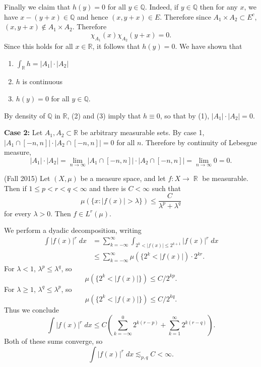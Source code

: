 \documentclass[answers]{exam}
\DeclareMathOperator{\RR}{\mathbb{R}}
\theoremstyle{problemstyle}
\newcommand{\1}[1]{\textbf{1}_{\left[#1\right]}} %
\def\R{\mathbb{R}} %
\def\Q{\mathbb{Q}} %
\begin{document}
\begin{questions}
\begin{solution}
  Finally we claim that $h(y)=0$ for all $y\in \Q$. Indeed, if $y\in \Q$ then for any $x$, we have $x-(y+x)\in \Q$ and hence $(x,y+x)\in E$. Therefore since $A_{1}\times A_{2}\subset E^{c}$, $(x,y+x)\notin A_{1}\times A_{2}$. Therefore 
  \begin{equation*}
    \chi_{A_{1}}(x)\chi_{A_{2}}(y+x)=0.
  \end{equation*}
  Since this holds for all $x\in \R$, it follows that $h(y)= 0$.
  We have shown that
  \begin{enumerate}
  \item $\int_{\R} h = |A_{1}|\cdot |A_{2}|$
  \item $h$ is continuous
  \item $h(y) = 0$ for all $y\in \Q$.
  \end{enumerate}
  By density of $\Q$ in $\R$, (2) and (3) imply that $h\equiv 0$, so that by (1), $|A_{1}|\cdot |A_{2}| = 0$.

  \textbf{Case 2:} Let $A_{1},A_{2}\subset \R$ be arbitrary measurable sets. By case 1,  $|A_{1}\cap [-n,n]|\cdot |A_{2}\cap [-n,n]| =0$ for all $n$. Therefore by continuity of Lebesgue measure,
  \begin{equation*}
    |A_{1}|\cdot|A_{2}| = \lim_{n\to\infty}|A_{1}\cap [-n,n]|\cdot |A_{2}\cap [-n,n]| =\lim_{n\to\infty}0=0.
  \end{equation*}
\end{solution}

\question (Fall 2015) Let $(X, \mu)$ be a measure space, and let $f: X \to \RR$ be measurable. Then if $1 \leq p < r < q < \infty$ and there is $C < \infty$ such that
%
\[ \mu(\{ x : |f(x)| > \lambda \}) \leq \frac{C}{\lambda^p + \lambda^q} \]
%
for every $\lambda > 0$. Then $f \in L^r(\mu)$.
\begin{solution}
    We perform a dyadic decomposition, writing
    \begin{align*}
        \int |f(x)|^r\; dx &= \sum_{k = -\infty}^\infty \int_{2^k < |f(x)| \leq 2^{k+1}} |f(x)|^r\; dx\\
        &\leq \sum_{k = -\infty}^\infty \mu(\{ 2^k < |f(x)|) \cdot 2^{kr}.
    \end{align*}
    For $\lambda < 1$, $\lambda^p \leq \lambda^q$, so
    \[ \mu(\{ 2^k < |f(x)| \}) \leq C/2^{kp}. \]
    For $\lambda \geq 1$, $\lambda^q \leq \lambda^p$, so
    \[ \mu(\{ 2^k < |f(x)| \}) \leq C/2^{kq}. \]
    Thus we conclude
    \[ \int |f(x)|^r\; dx \leq C \left( \sum_{k = -\infty}^0 2^{k(r - p)} + \sum_{k = 1}^\infty 2^{k(r - q)} \right). \]
    Both of these sums converge, so
    \[  \int |f(x)|^r\; dx \lesssim_{p,q} C < \infty. \]
\end{solution}


\end{questions}
\end{document}

